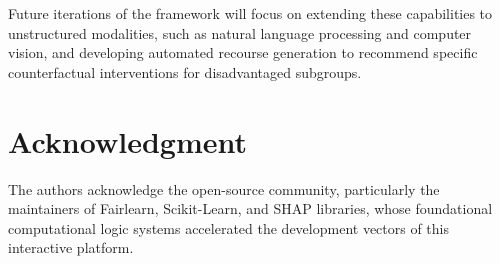 \documentclass[conference]{IEEEtran}
\begin{document}
Future iterations of the framework will focus on extending these capabilities to unstructured modalities, such as natural language processing and computer vision, and developing automated recourse generation to recommend specific counterfactual interventions for disadvantaged subgroups.

\section*{Acknowledgment}

The authors acknowledge the open-source community, particularly the maintainers of Fairlearn, Scikit-Learn, and SHAP libraries, whose foundational computational logic systems accelerated the development vectors of this interactive platform.



\end{document}
